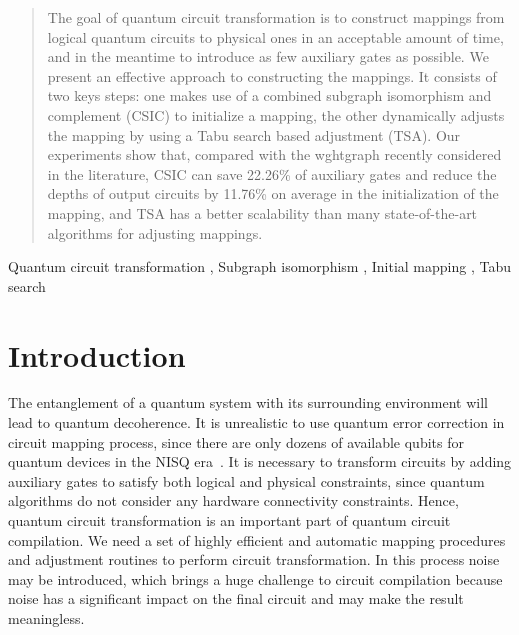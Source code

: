 \documentclass[journal]{IEEEtran}
\begin{document}
\begin{abstract}
The goal of quantum circuit transformation is to construct mappings from logical quantum circuits to physical ones in an acceptable amount of time, and in the meantime to introduce  as few auxiliary gates as possible. We present an effective approach to constructing the mappings. It consists of two keys steps: one makes use of a combined subgraph isomorphism and complement (CSIC) to initialize a mapping, the other dynamically adjusts the mapping by using a Tabu search based adjustment (TSA). Our experiments show that, compared with the wghtgraph recently considered in the literature, CSIC can save 22.26\% of auxiliary gates and reduce the depths of output circuits by 11.76\% on average in the initialization of the mapping, and  TSA has a better scalability than many state-of-the-art algorithms for adjusting mappings.
\end{abstract}

\begin{IEEEkeywords}
Quantum circuit transformation  ,  Subgraph isomorphism , Initial mapping , Tabu search
\end{IEEEkeywords}

%
\IEEEpeerreviewmaketitle
\section{Introduction}

The entanglement of a quantum system with its surrounding environment will lead to quantum decoherence. It is unrealistic to use quantum error correction in circuit mapping process, since there are only dozens of available qubits for quantum devices in the NISQ era~\cite{2018QuantumPreskill}. It is necessary to transform circuits by adding auxiliary gates to satisfy both logical and physical constraints, since quantum algorithms do not consider any hardware connectivity constraints. Hence, quantum circuit transformation is an important part of quantum circuit compilation. We need a set of highly efficient and automatic mapping procedures and adjustment routines to perform circuit transformation. In this process noise may be introduced, which brings a huge challenge to circuit compilation because noise has a significant impact on the final circuit and may make the result meaningless. 
\end{document}
